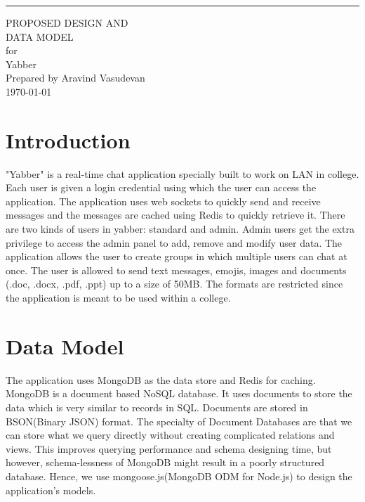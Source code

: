 \documentclass{scrreprt}
\date{}
\begin{document}
\begin{flushright}
    \rule{16cm}{5pt}\vskip1cm
    \begin{bfseries}
        \Huge{PROPOSED DESIGN AND \\ DATA MODEL}\\
        \vspace{1.9cm}
        for\\
        \vspace{1.9cm}
        Yabber\\
        \vspace{1.9cm}
        \large{Prepared by Aravind Vasudevan}\\
        \vspace{1.9cm}
        \today\\
    \end{bfseries}
\end{flushright}

\tableofcontents

\chapter{Introduction}

"Yabber" is a real-time chat application specially built to work on LAN in
college. Each user is given a login credential using which the user can access
the application. The application uses web sockets to quickly send and receive
messages and the messages are cached using Redis to quickly retrieve it. There
are two kinds of users in yabber: standard and admin. Admin users get the extra
privilege to access the admin panel to add, remove and modify user data. The
application allows the user to create groups in which multiple users can chat at
once. The user is allowed to send text messages, emojis, images and documents
(.doc, .docx, .pdf, .ppt) up to a size of 50MB. The formats are restricted since
the application is meant to be used within a college.

{\let\clearpage\relax \chapter{Data Model}}
The application uses MongoDB as the data store and Redis for caching. MongoDB is a
document based NoSQL database. It uses documents to store the data which is very
similar to records in SQL. Documents are stored in BSON(Binary JSON) format. The
specialty of Document Databases are that we can store what we query directly
without creating complicated relations and views. This improves querying
performance and schema designing time, but however, schema-lessness of MongoDB
might result in a poorly structured database. Hence, we use
mongoose.js(MongoDB ODM for Node.js) to design the application's models. \\
\end{document}
